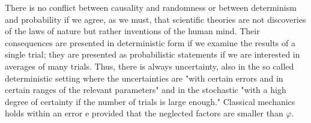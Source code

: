 \documentclass[onecollarge,runningheads]{svjour2}
\begin{document}
There is no conflict between causality and randomness or between determinism and probability if we agree, as we must, that scientific theories are not discoveries of the laws of nature but rather inventions of the human mind. Their consequences are presented in deterministic form if we examine the results of a single trial; they are presented as probabilistic statements if we are interested in averages of many trials. Thus, there is always uncertainty, also in the so called deterministic setting where the uncertainties are "with certain errors and in certain ranges of the relevant parameters" and in the stochastic "with a high degree of certainty if the number of trials is large enough." Classical mechanics holds within an error e provided that the neglected factors are smaller than $\varphi$.
\end{document}
